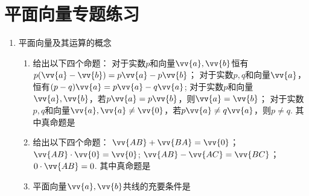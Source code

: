 \chapter*{平面向量专题练习}
\begin{enumerate}
    \item 平面向量及其运算的概念
    \begin{enumerate}
        \item 给出以下四个命题：
         对于实数$p$和向量$\vv{a}, \vv{b}$恒有$p(\vv{a} - \vv{b}) = p\vv{a} - p\vv{b}$；
        对于实数$p, q$和向量$\vv{a}$，恒有$(p-q)\vv{a} = p\vv{a} - q\vv{a}$;
        对于实数$p$和向量$\vv{a}, \vv{b}$，若$p\vv{a} = p\vv{b}$，则$\vv{a} = \vv{b}$；
        对于实数$p, q$和向量$\vv{a}, \vv{a} \neq \vv{0}$，若$p \vv{a} \neq q \vv{a}$，则$p \neq q$. 
        其中真命题是
        \begin{jieda}
        \end{jieda}
        \item 给出以下四个命题：
         $\vv{AB} + \vv{BA} = \vv{0}$；
         $\vv{AB} \cdot \vv{0} = \vv{0}$;
         $\vv{AB} - \vv{AC} = \vv{BC}$；
         $0 \cdot \vv{AB} = 0$. 其中真命题是
        \begin{jieda}
        \end{jieda}
        \item 平面向量$\vv{a}, \vv{b}$共线的充要条件是

\end{enumerate}
\end{enumerate}
